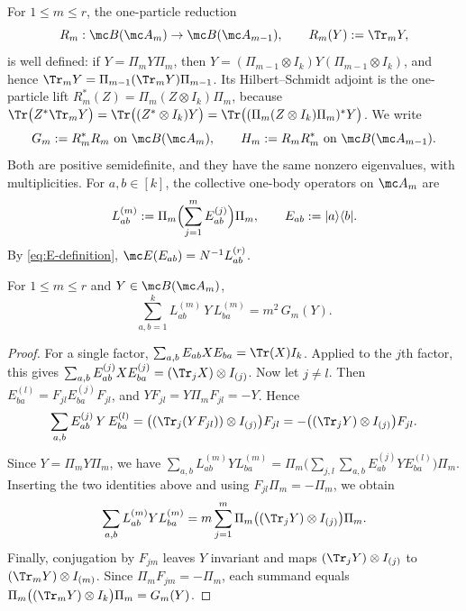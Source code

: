 For \(1\le m\le r\), the one-particle reduction
\begin{equation}
    R_m:\mc B(\mc A_m)\to\mc B(\mc A_{m-1}),
    \qquad
    R_m(Y):=\Tr_mY,
\end{equation}
is well defined: if \(Y=\Pi_mY\Pi_m\), then
\(Y=(\Pi_{m-1}\otimes I_k)Y(\Pi_{m-1}\otimes I_k)\), and hence
\(\Tr_mY=\Pi_{m-1}(\Tr_mY)\Pi_{m-1}\).  Its Hilbert--Schmidt adjoint is
the one-particle lift \(R_m^*(Z)=\Pi_m(Z\otimes I_k)\Pi_m\), because
\(\Tr\bigl(Z^*\Tr_mY\bigr)=\Tr\bigl((Z^*\otimes I_k)Y\bigr)
=\Tr\bigl((\Pi_m(Z\otimes I_k)\Pi_m)^*Y\bigr)\).  We write
\begin{equation}
    G_m:=R_m^*R_m\ \text{on }\mc B(\mc A_m),
    \qquad
    H_m:=R_mR_m^*\ \text{on }\mc B(\mc A_{m-1}).
\end{equation}
Both are positive semidefinite, and they have the same nonzero
eigenvalues, with multiplicities.  For \(a,b\in[k]\), the collective
one-body operators on \(\mc A_m\) are
\begin{equation}
 L_{ab}^{(m)}
 :=\Pi_m\Bigl(\sum_{j=1}^mE_{ab}^{(j)}\Bigr)\Pi_m,
 \qquad
 E_{ab}:=|a\rangle\langle b|.
 \label{eq:app-Lab-m}
\end{equation}
By \eqref{eq:E-definition}, \(\mc E(E_{ab})=N^{-1}L_{ab}^{(r)}\).
 
\begin{proposition}\label{prop:app-one-body-twirl}
For \(1\le m\le r\) and \(Y\in\mc B(\mc A_m)\),
\begin{equation}
    \sum_{a,b=1}^kL_{ab}^{(m)}\,Y\,L_{ba}^{(m)}
    =m^2\,G_m(Y).
\end{equation}
\end{proposition}
 
\begin{proof}
For a single factor, \(\sum_{a,b}E_{ab}XE_{ba}=\Tr(X)I_k\).  Applied to
the \(j\)th factor, this gives
\(\sum_{a,b}E_{ab}^{(j)}XE_{ba}^{(j)}=(\Tr_jX)\otimes I_{(j)}\).  Now let
\(j\neq l\).  Then \(E_{ba}^{(l)}=F_{jl}E_{ba}^{(j)}F_{jl}\), and
\(YF_{jl}=Y\Pi_mF_{jl}=-Y\).  Hence
\begin{equation}
    \sum_{a,b}E_{ab}^{(j)}\,Y\,E_{ba}^{(l)}
    =\bigl((\Tr_j(YF_{jl}))\otimes I_{(j)}\bigr)F_{jl}
    =-\bigl((\Tr_jY)\otimes I_{(j)}\bigr)F_{jl}.
\end{equation}
Since \(Y=\Pi_mY\Pi_m\), we have
\(\sum_{a,b}L_{ab}^{(m)}YL_{ba}^{(m)}
=\Pi_m\bigl(\sum_{j,l}\sum_{a,b}E_{ab}^{(j)}YE_{ba}^{(l)}\bigr)\Pi_m\).
Inserting the two identities above and using \(F_{jl}\Pi_m=-\Pi_m\), we
obtain
\begin{equation}
    \sum_{a,b}L_{ab}^{(m)}YL_{ba}^{(m)}
    =m\sum_{j=1}^m\Pi_m\bigl((\Tr_jY)\otimes I_{(j)}\bigr)\Pi_m.
\end{equation}
Finally, conjugation by \(F_{jm}\) leaves \(Y\) invariant and maps
\((\Tr_jY)\otimes I_{(j)}\) to \((\Tr_mY)\otimes I_{(m)}\).  Since
\(\Pi_mF_{jm}=-\Pi_m\), each summand equals
\(\Pi_m\bigl((\Tr_mY)\otimes I_k\bigr)\Pi_m=G_m(Y)\).
\end{proof}
 
